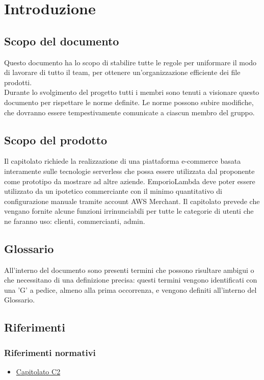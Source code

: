 \section{Introduzione}
    \subsection{Scopo del documento}
    Questo documento ha lo scopo di stabilire tutte le regole per uniformare il modo di lavorare di tutto il team, per ottenere un'organizzazione efficiente dei file prodotti. \\Durante lo svolgimento del progetto tutti i membri sono tenuti a visionare questo documento per rispettare le norme definite.
    Le norme possono subire modifiche, che dovranno essere tempestivamente comunicate a ciascun membro del gruppo.

    \subsection{Scopo del prodotto}
    Il capitolato richiede la realizzazione di una piattaforma e-commerce basata interamente sulle tecnologie serverless che possa essere utilizzata dal proponente come prototipo da mostrare ad altre aziende. EmporioLambda deve poter essere utilizzato da un ipotetico commerciante con il minimo quantitativo di configurazione manuale tramite account AWS Merchant. Il capitolato prevede che vengano fornite alcune funzioni irrinunciabili per tutte le categorie di utenti che ne faranno uso: clienti, commercianti, admin.
    \subsection{Glossario}
    All'interno del documento sono presenti termini che possono risultare ambigui o che necessitano di una definizione precisa: questi termini vengono identificati con una 'G' a pedice, almeno alla prima occorrenza, e vengono definiti all'interno del Glossario.
    \subsection{Riferimenti}
        \subsubsection{Riferimenti normativi}
        \begin{itemize}
            \item \href{https://www.math.unipd.it/~tullio/IS-1/2020/Progetto/C2.pdf}{Capitolato C2}
        \end{itemize}

